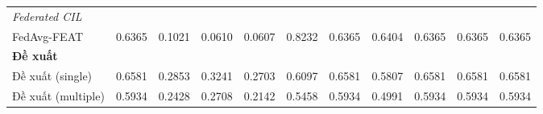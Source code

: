 \begin{table}[H]
{\begin{tabular}{lcccccccccc}
        \hline
        \multicolumn{11}{l}{\textit{Federated CIL}} \\
        FedAvg-FEAT & \cellcolor{green!90!black}0.6365 & 0.1021 & 0.0610 & 0.0607 & \cellcolor{green!60!black}0.8232 & \cellcolor{green!90!black}0.6365 & \cellcolor{green!60!black}0.6404 & \cellcolor{green!90!black}0.6365 & \cellcolor{green!90!black}0.6365 & \cellcolor{green!90!black}0.6365 \\
        \hline
        \multicolumn{11}{l}{\textbf{Đề xuất}} \\
        Đề xuất (single) & \cellcolor{green!60!black}0.6581 & \cellcolor{green!60!black}0.2853 & \cellcolor{green!30}0.3241 & \cellcolor{green!60!black}0.2703 & \cellcolor{green!90!black}0.6097 & \cellcolor{green!60!black}0.6581 & \cellcolor{green!90!black}0.5807 & \cellcolor{green!60!black}0.6581 & \cellcolor{green!60!black}0.6581 & \cellcolor{green!60!black}0.6581 \\
        Đề xuất (multiple) & 0.5934 & \cellcolor{green!90!black}0.2428 & 0.2708 & 0.2142 & 0.5458 & 0.5934 & 0.4991 & 0.5934 & 0.5934 & 0.5934 \\
        \hline
    \end{tabular}}
\end{table}
